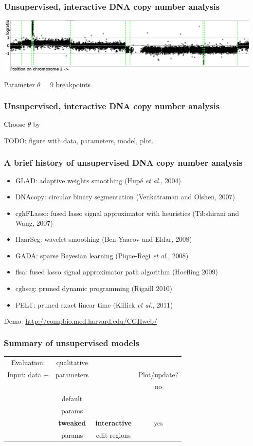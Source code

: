 \documentclass{beamer}
\begin{document}
\begin{frame}
  \frametitle{Unsupervised, interactive DNA copy number analysis}
  \includegraphics[width=\textwidth]{unlabeled-breakpoints-9}

  Parameter $\theta$ = 9 breakpoints.
\end{frame}

\begin{frame}
  \frametitle{Unsupervised, interactive DNA copy number analysis}
  
  Choose $\theta$ by 

  TODO: figure with data, parameters, model, plot.
\end{frame}

\begin{frame}
  \frametitle{A brief history of unsupervised DNA copy number analysis}
  \begin{itemize}
  \item GLAD: adaptive weights smoothing (Hup\'e \emph{et al.}, 2004)
  \item DNAcopy: circular binary segmentation (Venkatraman and Olshen,
    2007)
  \item cghFLasso: fused lasso signal approximator with heuristics
    (Tibshirani and Wang, 2007)
  \item HaarSeg: wavelet smoothing (Ben-Yaacov and Eldar, 2008)
  \item GADA: sparse Bayesian learning (Pique-Regi \emph{et al.}, 2008)
  \item flsa: fused lasso signal approximator path algorithm (Hoefling 2009)
  \item cghseg: pruned dynamic programming (Rigaill 2010)
  \item PELT: pruned exact linear time (Killick \emph{et al.}, 2011)
  \end{itemize}
  Demo: \url{http://compbio.med.harvard.edu/CGHweb/}
\end{frame}

\begin{frame}
  \frametitle{Summary of unsupervised models}

  \begin{tabular}{c|c|c|c}
    Evaluation: & qualitative &  \\
    Input: data + & parameters & & Plot/update?\\
    \hline
    &  &  & no\\
    & default &  \\
    & params & \\
    \hline
    & \textbf{tweaked} & \textbf{interactive} & yes\\
    & params & edit regions
  \end{tabular}

\end{frame}
\end{document}
